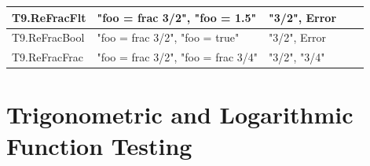 \documentclass[a4paper, oneside, 11pt]{report}
\begin{document}
\begin{tabular}{|p{1.5in}|p{1.5in}|p{1.6in}|p{1.6in}|p{2.4in}|}
        \hline
        T9.ReFracFlt   & "foo = frac 3/2", "foo = 1.5"                    & "3/2", Error                               &                                        \\
        \hline
        T9.ReFracBool   & "foo = frac 3/2", "foo = true"                    & "3/2", Error                               &                                        \\
        \hline
        T9.ReFracFrac   & "foo = frac 3/2", "foo = frac 3/4"                    & "3/2", "3/4"                               &                                        \\
        \hline
    \end{tabular}
    \section{Trigonometric and Logarithmic Function Testing}
    \label{TrigLogTest}
\end{document}
